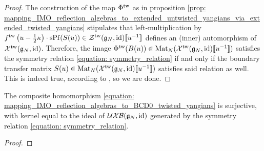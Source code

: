                 \begin{proof}
                    The construction of the map $\Phi^{\mathrm{tw}}$ as in proposition \ref{prop: mapping_IMO_reflection_algebras_to_extended_untwisted_yangians_via_extended_twisted_yangians} stipulates that left-multiplication by $f^{\mathrm{tw}}\left( u - \frac12 \kappa \right) \cdot \operatorname{sPf}( S(u) ) \in \mathcal{Z}^{\mathrm{tw}}(\mathfrak{g}_N, \mathrm{id})[\![u^{-1}]\!]$ defines an (inner) automorphism of $\mathcal{X}^{\mathrm{tw}}(\mathfrak{g}_N, \mathrm{id})$. Therefore, the image $\Phi^{\mathrm{tw}}( B(u) ) \in \mathrm{Mat}_N( \mathcal{X}^{\mathrm{tw}}(\mathfrak{g}_N, \mathrm{id})[\![u^{-1}]\!] )$ satisfies the symmetry relation \eqref{equation: symmetry_relation} if and only if the boundary transfer matrix $S(u) \in \mathrm{Mat}_N( \mathcal{X}^{\mathrm{tw}}(\mathfrak{g}_N, \mathrm{id})[\![u^{-1}]\!] )$ satisfies said relation as well. This is indeed true, according to \cite[Lemma 4.3]{guay_regelskis_twisted_yangians_for_symmetric_pairs_of_types_BCD}, so we are done.
                \end{proof}
            \begin{corollary} \label{coro: IMO_reflection_algebras_vs_BCD0_twisted_yangians}
                The composite homomorphism \eqref{equation: mapping_IMO_reflection_algebras_to_BCD0_twisted_yangians} is surjective, with kernel equal to the ideal of $\mathcal{UXB}(\mathfrak{g}_N, \mathrm{id})$ generated by the symmetry relation \eqref{equation: symmetry_relation}.
            \end{corollary}
                \begin{proof}
                    
                \end{proof}
    
    \printbibliography

